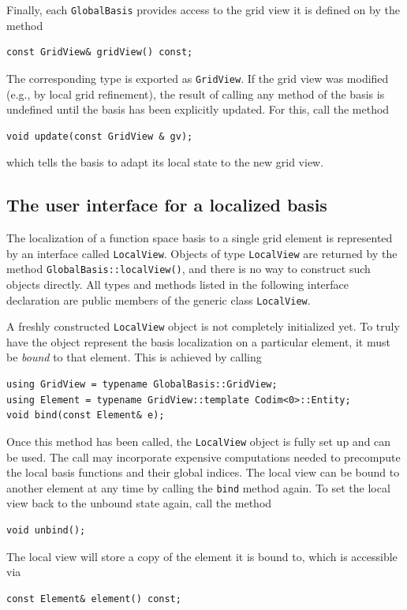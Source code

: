 \documentclass[a4paper,10pt,headings=normal,bibliography=totoc]{scrartcl}
\newcommand{\cpp}[1]{\lstinline[basicstyle=\ttfamily]!#1!}
\begin{document}
Finally, each \cpp{GlobalBasis} provides access to the grid view it is defined on
by the method
\begin{lstlisting}[style=Interface]
const GridView& gridView() const;
\end{lstlisting}
The corresponding type
is exported as \cpp{GridView}. If the grid view
was modified (e.g., by local grid refinement), the result of calling any
method of the basis is undefined until the basis has been explicitly updated.
For this, call the method
\begin{lstlisting}[style=Interface]
void update(const GridView & gv);
\end{lstlisting}
which tells the basis to adapt its local state to the new grid view.


\subsection{The user interface for a localized basis}
\label{sec:localview_interface}

The localization of a function space basis to a single grid element is represented
by an interface called \cpp{LocalView}. Objects of type
\cpp{LocalView} are returned by the method \cpp{GlobalBasis::localView()},
and there is no way to construct such objects directly.
All types and methods listed in the following
interface declaration are public members of
the generic class \cpp{LocalView}.

A freshly constructed \cpp{LocalView} object is not completely initialized yet.
To truly have the object represent the basis localization on a particular element,
it must be \emph{bound} to that element.  This is achieved by calling
\begin{lstlisting}[style=Interface]
using GridView = typename GlobalBasis::GridView;
using Element = typename GridView::template Codim<0>::Entity;
void bind(const Element& e);
\end{lstlisting}
Once this method has been called, the \cpp{LocalView} object is fully set up
and can be used.
The call may incorporate expensive computations needed to
precompute the local basis functions and their global indices.
The local view can be
bound to another element at any time by calling the \cpp{bind} method again.
To set the local view back to the unbound state again, call the method
\begin{lstlisting}[style=Interface]
void unbind();
\end{lstlisting}
The local view will store a copy of the
element it is bound to, which is accessible via
\begin{lstlisting}[style=Interface]
const Element& element() const;
\end{lstlisting}
\end{document}
